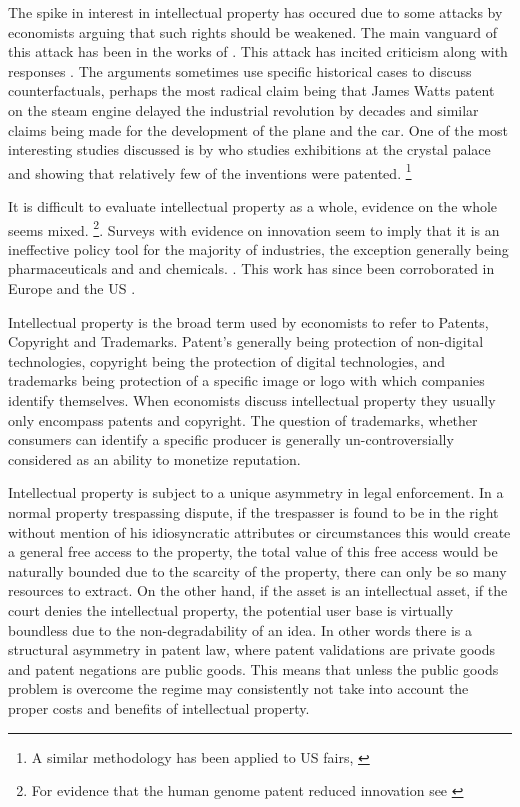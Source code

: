 \documentclass[12pt]{article}
\numberwithin{equation}{section}
\begin{document}
The spike in interest in intellectual property has occured due to some attacks by economists arguing that such rights should be weakened. The main vanguard of this attack has been in the works of \cite{dosi2006much} \cite{boldrinlevine}  \cite{bessen2008patent}. This attack has incited criticism \cite{scherer2009michele} along with responses \cite{boldrin2013s}. The arguments sometimes use specific historical cases to discuss counterfactuals, perhaps the most radical claim being that James Watts patent on the steam engine delayed the industrial revolution by decades \cite{boldrinlevine}\cite{nuvolari2004collective} and similar claims being made for the development of the plane and the car\cite{merges1994limiting}. One of the most interesting studies discussed is by \cite{moser2005patent} who studies exhibitions at the crystal palace and showing that relatively few of the inventions were patented\cite{moser2005patent}. \footnote{A similar methodology has been applied to US fairs, \cite{khan2013going}}


It is difficult to evaluate intellectual property as a whole, evidence on the whole seems mixed. \footnote{For evidence that the human genome patent reduced innovation see \cite{williams2013intellectual}}. Surveys with evidence on innovation seem to imply that it is an ineffective policy tool for the majority of industries, the exception generally being pharmaceuticals and and chemicals. \cite{mansfield1986patents} \cite{levin1987appropriating}. This work has since been corroborated in Europe\cite{arundel1998percentage} and the US \cite{cohen2000protecting}. 

Intellectual property is the broad term used by economists to refer to Patents, Copyright and Trademarks. Patent's generally being protection of non-digital technologies, copyright being the protection of digital technologies, and trademarks being protection of a specific image or logo with which companies identify themselves. When economists discuss intellectual property they usually only encompass patents and copyright. The question of trademarks, whether consumers can identify a specific producer is generally un-controversially considered as an ability to monetize reputation.

Intellectual property is subject to a unique asymmetry in legal enforcement. In a normal property trespassing dispute, if the trespasser is found to be in the right without mention of his idiosyncratic attributes or circumstances this would create a general free access to the property, the total value of this free access would be naturally bounded due to the scarcity of the property, there can only be so many resources to extract. On the other hand, if the asset is an intellectual asset, if the court denies the intellectual property, the potential user base is virtually boundless due to the non-degradability of an idea. In other words there is a structural asymmetry in patent law, where patent validations are private goods and patent negations are public goods. This means that unless the public goods problem is overcome the regime may consistently not take into account the proper costs and benefits of intellectual property.
\end{document}
